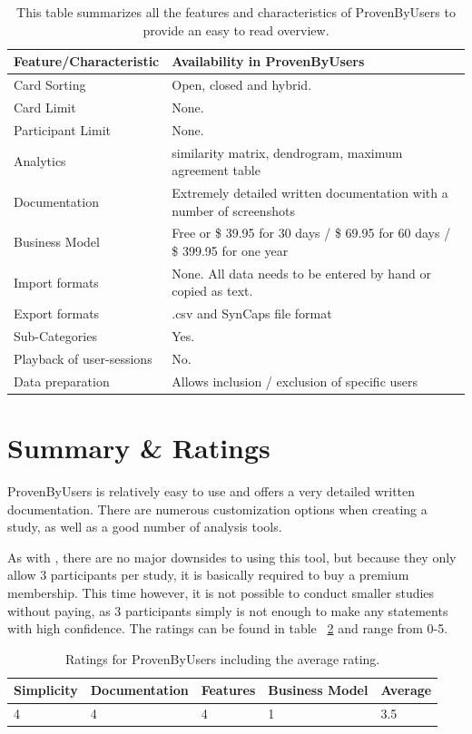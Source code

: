 \begin{table}[tp]
\centering
\begin{tabularx}
{\linewidth}{|l|X|}
\hline \textbf{Feature/Characteristic} & \textbf{Availability in ProvenByUsers} \\ 
\hline Card Sorting & Open, closed and hybrid. \\ 
\hline Card Limit & None. \\
\hline Participant Limit & None. \\
\hline Analytics &  similarity matrix, dendrogram, maximum agreement table\\ 
\hline Documentation & Extremely detailed written documentation with a number 
of screenshots \\
\hline Business Model & Free or  \$ 39.95 for 30 days / \$ 69.95 for 60 days / 
\$ 399.95 for one year\\
\hline Import formats & None. All data needs to be entered by hand or copied as 
text.\\ 
\hline Export formats & .csv and SynCaps file format \\ 
\hline Sub-Categories & Yes. \\ 
\hline Playback of user-sessions & No. \\ 
\hline Data preparation & Allows inclusion / exclusion of specific users \\ 
\hline
\end{tabularx} 
\caption[Feature summary of ProvenByUsers] 
{ 
This table summarizes all the features and characteristics of ProvenByUsers
to provide an easy to read overview.
}
\label{tab:features-ProvenByUsers}
\end{table}

\section{Summary \& Ratings}
ProvenByUsers is relatively easy to use and offers a very detailed written 
documentation. There are numerous customization options when creating a 
study, as well as a good number of analysis tools. 

As with \textcite{UXtweak}, there are no major downsides to using this tool, but
because they only allow 3 participants per study, it is basically required to 
buy a premium membership. This time however, it is not possible to conduct 
smaller studies without paying, as 3 participants simply is not enough to make 
any statements with high confidence. The ratings can be found in table
~\ref{tab:rating-ProvenByUsers} and range from 0-5.


\begin{table}[tp] 
\centering 
\begin{tabularx}{\linewidth}{|X|X|X|X|X|}
\hline
Simplicity & Documentation & Features & Business Model & Average \\ 
\hline 
4 & 4 & 4 & 1 & 3.5 \\ 
\hline 
\end{tabularx} 
\caption[Ratings for ProvenByUsers] {
Ratings for ProvenByUsers including the average rating.
} 
\label{tab:rating-ProvenByUsers}
\end{table}



